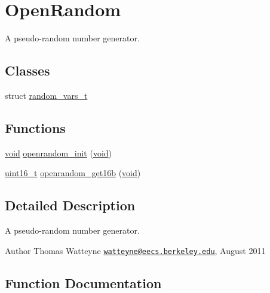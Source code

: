 \hypertarget{group___open_random}{}\section{Open\+Random}
\label{group___open_random}


A pseudo-\/random number generator.  


\subsection*{Classes}
\begin{DoxyCompactItemize}
\item 
struct \hyperlink{structrandom__vars__t}{random\+\_\+vars\+\_\+t}
\end{DoxyCompactItemize}
\subsection*{Functions}
\begin{DoxyCompactItemize}
\item 
\hyperlink{usb__devapi_8h_afabf60e7f57651d6d595a02c75f07cd0}{void} \hyperlink{group___open_random_gaba64bed43b28e866086767c9daf83390}{openrandom\+\_\+init} (\hyperlink{usb__devapi_8h_afabf60e7f57651d6d595a02c75f07cd0}{void})
\item 
\hyperlink{_p_e___types_8h_a1f1825b69244eb3ad2c7165ddc99c956}{uint16\+\_\+t} \hyperlink{group___open_random_ga70626e5a23d14d7d426517fb5389252d}{openrandom\+\_\+get16b} (\hyperlink{usb__devapi_8h_afabf60e7f57651d6d595a02c75f07cd0}{void})
\end{DoxyCompactItemize}


\subsection{Detailed Description}
A pseudo-\/random number generator. 

\begin{DoxyAuthor}{Author}
Thomas Watteyne \href{mailto:watteyne@eecs.berkeley.edu}{\tt watteyne@eecs.\+berkeley.\+edu}, August 2011 
\end{DoxyAuthor}


\subsection{Function Documentation}
